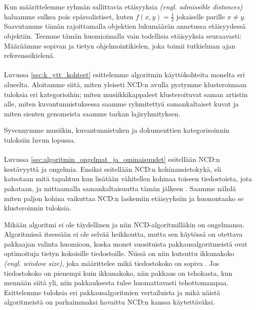 \documentclass[12pt,finnish,draft]{tktltiki2}
\theoremstyle{definition}
\theoremstyle{remark}
\newcommand{\engl}[1]{\emph{(engl. #1)}}
\begin{document}
  Kun määrittelemme ryhmän sallittavia etäisyyksia \engl{admissible distances} haluamme sulkea pois epärealistiset, kuten $f(x,y) = \frac{1}{2}$ jokaiselle parille $x \neq y$. Saavutamme tämän rajoittamalla objektien lukumäärän annetussa etäisyydessä objektiin. Teemme tämän huomioimalla vain todellisia etäisyyksia seuraavasti: Määräämme sopivan ja tietyn ohjelmointikielen, joka toimii tutkielman ajan referenssikielenä. \cite{CV05}


\paragraph{} %
\label{par:intro-3}
  Luvussa \ref{sec:k_ytt_kohteet} esittelemme algoritmin käyttökohteita monelta eri alueelta. Aloitamme siitä, miten yleiseti NCD:n avulla pystymme klusteroimaan tuloksia eri kategorioihin; miten musiikkikappaleet klusteroituvat saman artistin alle, miten kuvantunnistuksessa saamme ryhmitettyä samankaltaiset kuvat ja miten sienten genomeista saamme tarkan lajiryhmityksen.

  Syvennymme musiikin, kuvantunnistuken ja dokumenttien kategorisoinnin tuloksiin luvun lopussa.


\paragraph{} %
\label{par:intro-4}
  Luvussa \ref{sec:algoritmin_ongelmat_ja_ominaisuudet} esitellään NCD:n kestävyyttä ja ongelmia. Ensiksi esitellään NCD:n kohinansietokykä, eli katsotaan mitä tapahtuu kun lisätään vähitellen kohinaa toiseen tiedostoista, jota pakataan, ja mittaamalla samankaltaisuutta tämän jälkeen \cite{4167725}. Saamme nähdä miten paljon kohina vaikuttaa NCD:n laskemiin etäisyyksiin ja huonontaako se klusteroinnin tuloksia.

  Mikään algoritmi ei ole täydellinen ja niin NCD-algoritmilläkin on ongelmansa. Algoritmissä itsessään ei ole selvää heikkoutta, mutta sen käytössä on otettava pakkaajan valinta huomioon, koska monet suosituista pakkausalgoritmeistä ovat optimoituja tietyn kokoisille tiedostoille. Niissä on niin kutsuttu ikkunakoko \engl{window size}, joka määrittelee mikä tiedostokoko on sopiva \cite{cebrian2005common}. Jos tiedostokoko on pienempi kuin ikkunakoko, niin pakkaus on tehokasta, kun mennään siitä yli, niin pakkauksesta tulee huomattavasti tehottomampaa. Esittelemme tuloksia eri pakkausalgoritmien vertailuista ja mikä näistä algoritmeistä on parhaimmaksi havaittu NCD:n kanssa käytettäväksi.
\end{document}
